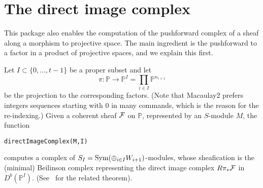 \documentclass[twoside,12pt, leqno]{amsart}
\def\PP{{\mathbb P}}
\def\P{{\mathbb P}}
\begin{document}
%


\section{The direct image complex}\label{sec:push forward}
This package also enables the computation of the pushforward complex of a sheaf along a morphism
to projective space. The main ingredient is the pushforward to a factor in a product of projective
spaces, and we explain this first. 

Let $I \subset \{0,\ldots,t-1 \}$ be a proper subset and let
$$ \pi \colon\PP \to  \PP^I=\prod_{i \in  I} \PP^{n_{i+1}}$$
be the projection to the corresponding factors. (Note that Macaulay2 prefers integers sequences starting with $0$ in many commands, which is the reason for the re-indexing.) Given a coherent sheaf ${\mathcal F}$ on $\PP$, represented by an $S$-module $M$,
the function
{\small \begin{verbatim}
directImageComplex(M,I)
\end{verbatim}}
\noindent computes a complex of $S_I = \operatorname{Sym} (\oplus_{i \in I} W_{i+1})$-modules, whose sheafication
is the (minimal) Beilinson complex representing the direct image complex $R\pi_* {\mathcal F}$ in $D^b(\PP^I)$.  (See~\cite[Corollary 0.3]{EES} for the related theorem).
\end{document}
